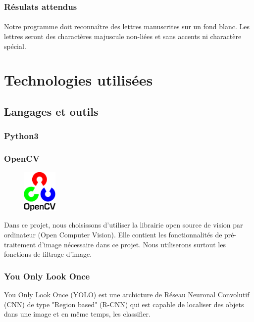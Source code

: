 \documentclass[a4paper]{article}
\begin{document}
			\subsubsection{Résulats attendus}
				\paragraph{}
					Notre programme doit reconnaître des lettres manuscrites sur un fond blanc. Les lettres seront des charactères majuscule non-liées et sans accents ni charactère spécial.
	\section{Technologies utilisées} 
		\subsection{Langages et outils}
			\subsubsection{Python3}
			\subsubsection{OpenCV}
				\begin{figure}
					\includegraphics[width=0.15\textwidth]{OpenCV.png}
				\end{figure}
				Dans ce projet, nous choisissons d'utiliser la librairie open source de vision par ordinateur (Open Computer Vision). Elle contient les fonctionnalités de pré-traitement d'image nécessaire dans ce projet. Nous utiliserons surtout les fonctions de filtrage d'image.
				\newline
			\subsubsection{You Only Look Once}
				You Only Look Once (YOLO) est une archicture de Réseau Neuronal Convolutif (CNN) de type "Region based" (R-CNN) qui est capable de localiser des objets dans une image et en même temps, les classifier.
\end{document}
